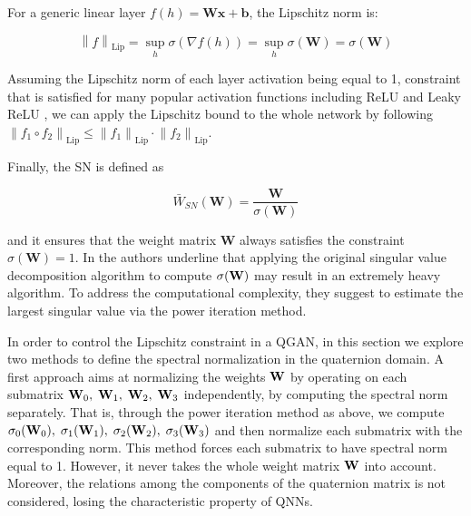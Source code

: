 \documentclass[graybox]{svmult}
\begin{document}
For a generic linear layer $f(h) = \mathbf{W}\mathbf{x} +\mathbf{b}$, the Lipschitz norm is:

\begin{equation}
    \left\|f\right\|_{\text{Lip}} = \sup_h \sigma (\nabla f(h)) = \sup_h \sigma(\mathbf{W}) = \sigma(\mathbf{W})
\label{eq:sigma_w}
\end{equation}

\noindent Assuming the Lipschitz norm of each layer activation being equal to 1, constraint that is satisfied for many popular activation functions including ReLU and Leaky ReLU \cite{Miyato2018SpectralNF}, we can apply the Lipschitz bound to the whole network by following $\left\|f_1 \circ f_2\right\|_{\text{Lip}} \le \left\|f_1\right\|_{\text{Lip}} \cdot \left\|f_2\right\|_{\text{Lip}}$.

Finally, the SN is defined as

\begin{equation}
    \bar{W}_{SN}(\mathbf{W}) = \frac{\mathbf{W}}{\sigma(\mathbf{W})}
\label{eq:sn}
\end{equation}

\noindent and it ensures that the weight matrix $\mathbf{W}$ always satisfies the constraint $\sigma(\mathbf{W})=1$. In \cite{Miyato2018SpectralNF} the authors underline that applying the original singular value decomposition algorithm to compute $\sigma({\mathbf W})$ may result in an extremely heavy algorithm. To address the computational complexity, they suggest to estimate the largest singular value via the power iteration method.

In order to control the Lipschitz constraint in a QGAN, in this section we explore two methods to define the spectral normalization in the quaternion domain. 
A first approach aims at normalizing the weights ${\mathbf W}$ by operating on each submatrix ${\mathbf W}_0, \; {\mathbf W}_1, \; {\mathbf W}_2, \; {\mathbf W}_3$ independently, by computing the spectral norm separately. That is, through the power iteration method as above, we compute $\sigma_0({\mathbf W}_0), \; \sigma_1({\mathbf W}_1), \; \sigma_2({\mathbf W}_2), \; \sigma_3({\mathbf W}_3)$ and then normalize each submatrix with the corresponding norm. This method forces each submatrix to have spectral norm equal to 1. However, it never takes the whole weight matrix ${\mathbf W}$ into account. Moreover, the relations among the components of the quaternion matrix is not considered, losing the characteristic property of QNNs. 
\end{document}
